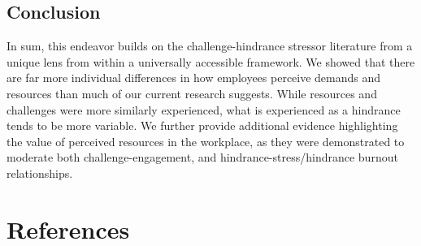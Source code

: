 \documentclass[
  man]{apa7}
\begin{document}
\hypertarget{conclusion}{%
\subsection{Conclusion}\label{conclusion}}

In sum, this endeavor builds on the challenge-hindrance stressor literature from a unique lens from within a universally accessible framework. We showed that there are far more individual differences in how employees perceive demands and resources than much of our current research suggests. While resources and challenges were more similarly experienced, what is experienced as a hindrance tends to be more variable. We further provide additional evidence highlighting the value of perceived resources in the workplace, as they were demonstrated to moderate both challenge-engagement, and hindrance-stress/hindrance burnout relationships.

\hypertarget{references}{%
\section{References}\label{references}}

\begingroup
\setlength{\parindent}{-0.5in}
\setlength{\leftskip}{0.5in}
\end{document}
